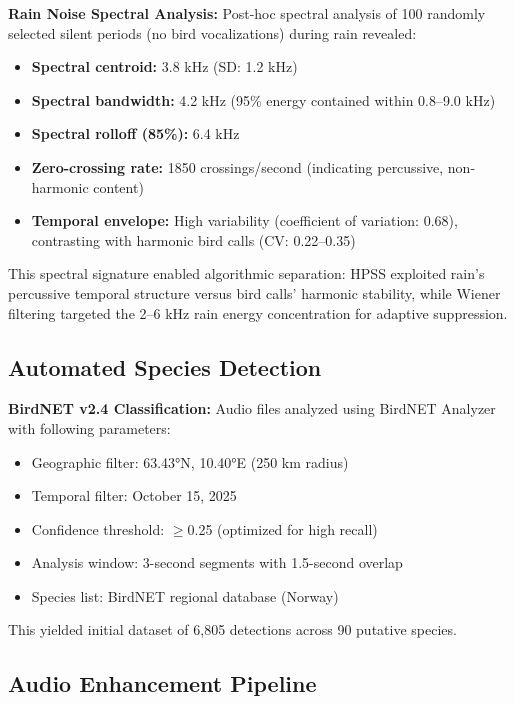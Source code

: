 \documentclass[twocolumn]{article}
\begin{document}
\textbf{Rain Noise Spectral Analysis:} Post-hoc spectral analysis of 100 randomly selected silent periods (no bird vocalizations) during rain revealed:

\begin{itemize}
\item \textbf{Spectral centroid:} 3.8 kHz (SD: 1.2 kHz)
\item \textbf{Spectral bandwidth:} 4.2 kHz (95\% energy contained within 0.8--9.0 kHz)
\item \textbf{Spectral rolloff (85\%):} 6.4 kHz
\item \textbf{Zero-crossing rate:} 1850 crossings/second (indicating percussive, non-harmonic content)
\item \textbf{Temporal envelope:} High variability (coefficient of variation: 0.68), contrasting with harmonic bird calls (CV: 0.22--0.35)
\end{itemize}

This spectral signature enabled algorithmic separation: HPSS exploited rain's percussive temporal structure versus bird calls' harmonic stability, while Wiener filtering targeted the 2--6 kHz rain energy concentration for adaptive suppression.

\subsection{Automated Species Detection}

\textbf{BirdNET v2.4 Classification:} Audio files analyzed using BirdNET Analyzer \citep{Kahl2021} with following parameters:

\begin{itemize}
\item Geographic filter: 63.43°N, 10.40°E (250 km radius)
\item Temporal filter: October 15, 2025
\item Confidence threshold: $\geq$0.25 (optimized for high recall)
\item Analysis window: 3-second segments with 1.5-second overlap
\item Species list: BirdNET regional database (Norway)
\end{itemize}

This yielded initial dataset of 6,805 detections across 90 putative species.

\subsection{Audio Enhancement Pipeline}
\end{document}
